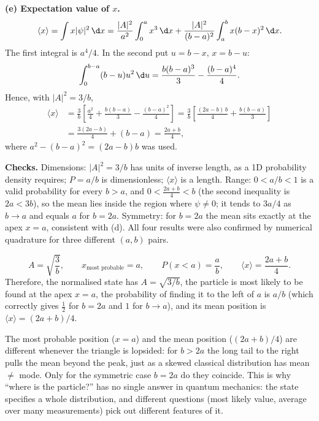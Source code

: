 \begin{solutionbox}
\textbf{(e) Expectation value of $x$.}
\[
\langle x\rangle=\int x|\psi|^2\,\d x
=\frac{|A|^2}{a^2}\int_0^a x^3\,\d x+\frac{|A|^2}{(b-a)^2}\int_a^b x(b-x)^2\,\d x .
\]
The first integral is $a^4/4$. In the second put $u=b-x$, $x=b-u$:
\[
\int_0^{b-a}(b-u)u^2\,\d u=\frac{b(b-a)^3}{3}-\frac{(b-a)^4}{4}.
\]
Hence, with $|A|^2=3/b$,
\begin{align*}
\langle x\rangle
&=\frac{3}{b}\left[\frac{a^2}{4}+\frac{b(b-a)}{3}-\frac{(b-a)^2}{4}\right]
=\frac{3}{b}\left[\frac{(2a-b)\,b}{4}+\frac{b(b-a)}{3}\right]\\
&=\frac{3(2a-b)}{4}+(b-a)=\frac{2a+b}{4},
\end{align*}
where $a^2-(b-a)^2=(2a-b)b$ was used.

\textbf{Checks.} Dimensions: $|A|^2=3/b$ has units of inverse length, as a 1D probability density requires; $P=a/b$ is dimensionless; $\langle x\rangle$ is a length. Range: $0<a/b<1$ is a valid probability for every $b>a$, and $0<\tfrac{2a+b}{4}<b$ (the second inequality is $2a<3b$), so the mean lies inside the region where $\psi\neq0$; it tends to $3a/4$ as $b\to a$ and equals $a$ for $b=2a$. Symmetry: for $b=2a$ the mean sits exactly at the apex $x=a$, consistent with (d). All four results were also confirmed by numerical quadrature for three different $(a,b)$ pairs.
\end{solutionbox}

\begin{answerbox}
\[
A=\sqrt{\frac{3}{b}},\qquad x_{\text{most probable}}=a,\qquad P(x<a)=\frac{a}{b},\qquad \langle x\rangle=\frac{2a+b}{4}.
\]
Therefore, the normalised state has $A=\sqrt{3/b}$, the particle is most likely to be found at the apex $x=a$, the probability of finding it to the left of $a$ is $a/b$ (which correctly gives $\tfrac12$ for $b=2a$ and $1$ for $b\to a$), and its mean position is $\langle x\rangle=(2a+b)/4$.
\end{answerbox}

\begin{insightbox}
The most probable position ($x=a$) and the mean position ($(2a+b)/4$) are different whenever the triangle is lopsided: for $b>2a$ the long tail to the right pulls the mean beyond the peak, just as a skewed classical distribution has mean $\neq$ mode. Only for the symmetric case $b=2a$ do they coincide. This is why ``where is the particle?'' has no single answer in quantum mechanics: the state specifies a whole distribution, and different questions (most likely value, average over many measurements) pick out different features of it.
\end{insightbox}
